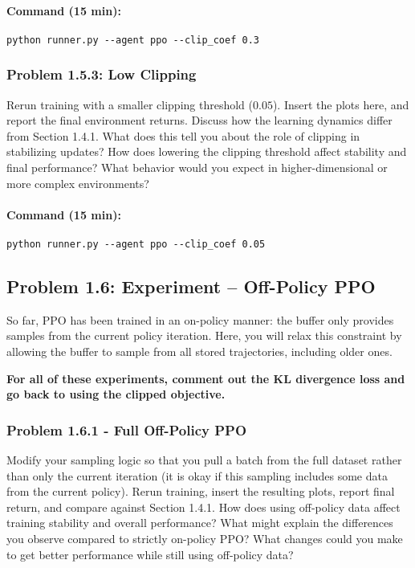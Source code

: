 \documentclass[12pt]{article}
\begin{document}
\paragraph{Command (15 min):}
\begin{verbatim}
python runner.py --agent ppo --clip_coef 0.3
\end{verbatim}


\begin{solution}[height=5cm]
\end{solution}

\subsubsection*{Problem 1.5.3: Low Clipping}
Rerun training with a smaller clipping threshold ($0.05$). Insert the plots here, and report the final environment returns.  Discuss how the learning dynamics differ from Section 1.4.1. What does this tell you about the role of clipping in stabilizing updates? How does lowering the clipping threshold affect stability and final performance? What behavior would you expect in higher-dimensional or more complex environments?

\paragraph{Command (15 min):}
\begin{verbatim}
python runner.py --agent ppo --clip_coef 0.05
\end{verbatim}

\begin{solution}[height=5cm]
\end{solution}

\newpage
\subsection*{Problem 1.6: Experiment – Off-Policy PPO}

So far, PPO has been trained in an on-policy manner: the buffer only provides samples from the current policy iteration. Here, you will relax this constraint by allowing the buffer to sample from all stored trajectories, including older ones.

\textbf{For all of these experiments, comment out the KL divergence loss and go back to using the clipped objective.}

\subsubsection*{Problem 1.6.1 - Full Off-Policy PPO}
Modify your sampling logic so that you pull a batch from the full dataset rather than only the current iteration (it is okay if this sampling includes some data from the current policy). Rerun training, insert the resulting plots, report final return, and compare against Section 1.4.1. How does using off-policy data affect training stability and overall performance? What might explain the differences you observe compared to strictly on-policy PPO?  What changes could you make to get better performance while still using off-policy data?
\end{document}
